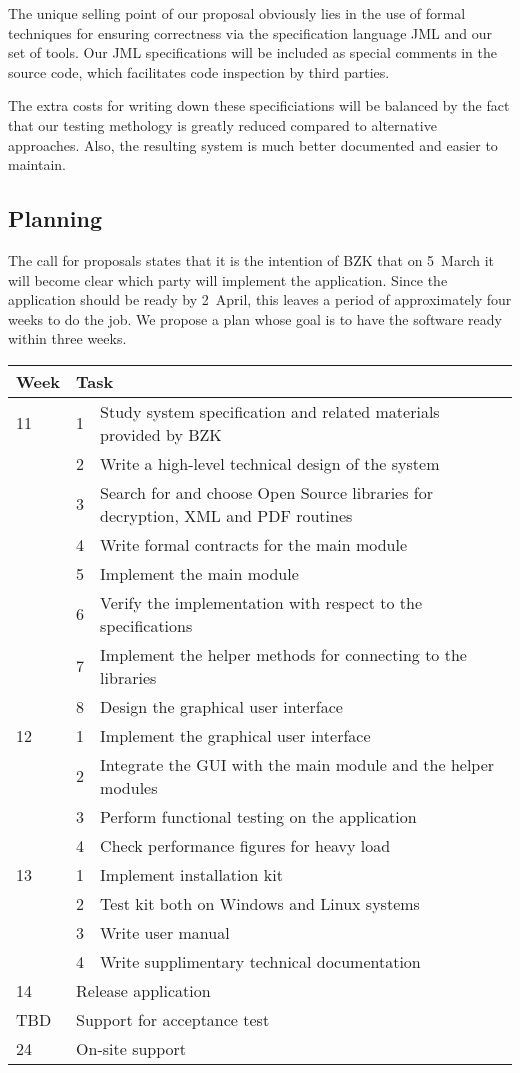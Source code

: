\documentclass{article}
\begin{document}
The unique selling point of our proposal obviously lies in the use of
formal techniques for ensuring correctness via the specification
language JML and our set of tools. Our JML specifications will be
included as special comments in the source code, which facilitates
code inspection by third parties.

The extra costs for writing down these specificiations will be
balanced by the fact that our testing methology is greatly reduced
compared to alternative approaches.  Also, the resulting system is
much better documented and easier to maintain.

\subsection{Planning}

The call for proposals states that it is the intention of BZK that on
5~March it will become clear which party will implement the
application.  Since the application should be ready by 2~April, this
leaves a period of approximately four weeks to do the job.  We propose
a plan whose goal is to have the software ready within three weeks.

\begin{tabular}{|l|r@{.\ }p{9.5cm}|}
\hline
Week &\multicolumn{2}{l|}{Task} \\ \hline
11   & 1& Study system specification and related materials provided by BZK \\
     & 2& Write a high-level technical design of the system \\
     & 3& Search for and choose Open Source libraries for decryption, XML and PDF routines \\
     & 4& Write formal contracts for the main module \\
     & 5& Implement the main module \\
     & 6& Verify the implementation with respect to the specifications \\
     & 7& Implement the helper methods for connecting to the libraries \\
     & 8& Design the graphical user interface \\ \hline
12   & 1& Implement the graphical user interface \\
     & 2& Integrate the GUI with the main module and the helper modules \\
     & 3& Perform functional testing on the application \\
     & 4& Check performance figures for heavy load \\ \hline
13   & 1& Implement installation kit \\
     & 2& Test kit both on Windows and Linux systems \\
     & 3& Write user manual \\
     & 4& Write supplimentary technical documentation \\ \hline
14   &\multicolumn{2}{l|}{Release application} \\ \hline
TBD  &\multicolumn{2}{l|}{Support for acceptance test} \\ \hline
24   &\multicolumn{2}{l|}{On-site support} \\
\hline
\end{tabular}
\end{document}
